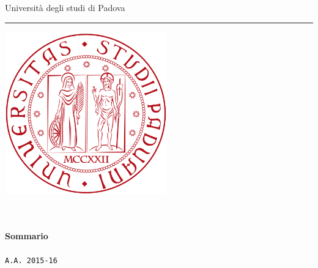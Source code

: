 \begin{titlepage}
	\begin{center}
     {\Large {Università degli studi di Padova}}\\
     \vspace{1em}
		 \hrule
		 \vspace{4em}
     \includegraphics[width=7cm]{./template/icone/logo.png}\\
		 \vspace{4em}
     {\huge \textbf{\documenttitle}}\\
		 \vspace{1em}
		 {\Large {\documentsubtitle}}\\
     \vspace{2em}

	\end{center}
	

	\vspace{2em}
	\begin{center}
		{\large \textbf{Sommario}}\\
	    
	    \vspace{1em}\\
		\texttt{A.A. 2015-16}\\
	\end{center}

\end{titlepage}
